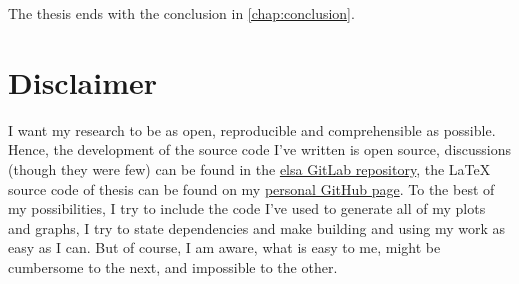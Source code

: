The thesis ends with the conclusion in \autoref{chap:conclusion}.

\section{Disclaimer}\label{sec:disclaimer}

I want my research to be as open, reproducible and comprehensible as possible. Hence, the
development of the source code I've written is open source, discussions (though they were few) can be
found in the \href{https://gitlab.lrz.de/IP/elsa}{elsa GitLab repository}, the \LaTeX{} source code
of thesis can be found on my
\href{https://github.com/ner0-m/ma-thesis-differential-basis-for-ct}{personal GitHub page}. To the
best of my possibilities, I try to include the code I've used to generate all of my plots and
graphs, I try to state dependencies and make building and using my work as easy as I can. But of
course, I am aware, what is easy to me, might be cumbersome to the next, and impossible to the
other.

